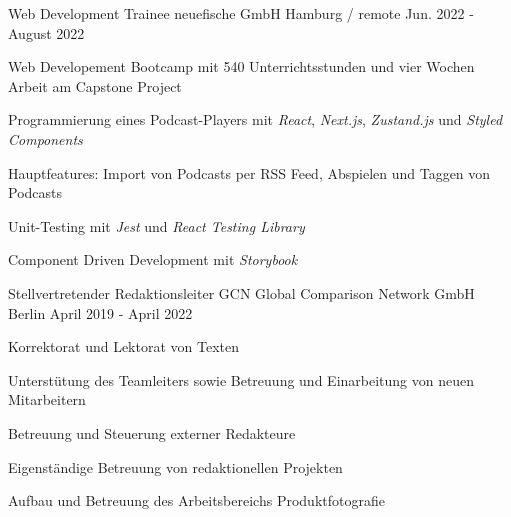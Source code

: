 

\begin{cventries}

  \cventry
    {Web Development Trainee} %
    {neuefische GmbH} %
    {Hamburg / remote} %
    {Jun. 2022 - August 2022} %
    {
      \begin{cvitems} %
        \item {Web Developement Bootcamp mit 540 Unterrichtsstunden und vier Wochen Arbeit am Capstone Project}
        \item {Programmierung eines Podcast-Players mit \emph{React}, \emph{Next.js}, \emph{Zustand.js} und \emph{Styled Components}}
        \item {Hauptfeatures: Import von Podcasts per RSS Feed, Abspielen und Taggen von Podcasts}
        \item {Unit-Testing mit \emph{Jest} und \emph{React Testing Library}}
        \item {Component Driven Development mit \emph{Storybook}}
      \end{cvitems}
    }

  \cventry
    {Stellvertretender Redaktionsleiter} %
    {GCN Global Comparison Network GmbH} %
    {Berlin} %
    {April 2019 - April 2022} %
    {
      \begin{cvitems} %
        \item {Korrektorat und Lektorat von Texten}
        \item {Unterstütung des Teamleiters sowie Betreuung und Einarbeitung von neuen Mitarbeitern}
        \item {Betreuung und Steuerung externer Redakteure}
        \item {Eigenständige Betreuung von redaktionellen Projekten}
        \item {Aufbau und Betreuung des Arbeitsbereichs Produktfotografie}
      \end{cvitems}
    }


\end{cventries}
